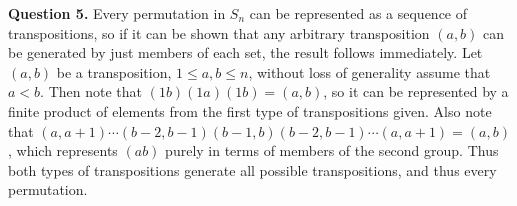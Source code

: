 \documentclass[letterpaper, reqno,11pt]{article}
\begin{document}
{\medskip\noindent\bf Question 5.} Every permutation in $S_n$ can be represented as a sequence of transpositions, so if it can be shown that any arbitrary transposition $(a,b)$ can be generated by just members of each set, the result follows immediately. Let $(a,b)$ be a transposition, $1\leq a,b\leq n$, without loss of generality assume that $a<b$. Then note that $(1b)(1a)(1b)=(a,b)$, so it can be represented by a finite product of elements from the first type of transpositions given. Also note that $(a,a+1)\cdots(b-2,b-1)(b-1,b)(b-2,b-1)\cdots(a,a+1)=(a,b)$, which represents $(ab)$ purely in terms of members of the second group. Thus both types of transpositions generate all possible transpositions, and thus every permutation.
\end{document}

